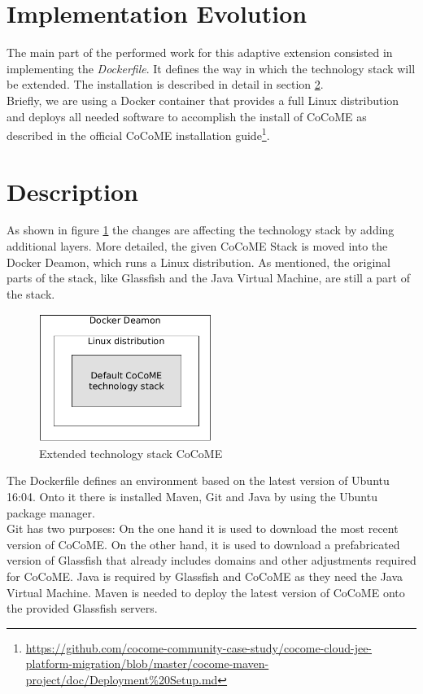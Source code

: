\documentclass[runningheads]{llncs}
\begin{document}
\section{Implementation Evolution}
	The main part of the performed work for this adaptive extension consisted in implementing the \textit{Dockerfile}. It defines the way in which the technology stack will be extended. The installation is described in detail in section \ref*{description}.\\ 
	Briefly, we are using a Docker container that provides a full Linux distribution and deploys all needed software to accomplish the install of CoCoME as described in the official  CoCoME installation guide\footnote{\url{https://github.com/cocome-community-case-study/cocome-cloud-jee-platform-migration/blob/master/cocome-maven-project/doc/Deployment\%20Setup.md}}.


\section{Description}\label{description}
	As shown in figure \ref*{techStack} the changes are affecting the technology stack by adding additional layers. More detailed, the given CoCoME Stack is moved into the Docker Deamon, which runs a Linux distribution. As mentioned, the original parts of the stack, like Glassfish and the Java Virtual Machine, are still a part of the stack.\\
\begin{figure}[H]
	\centering
	\includegraphics[width = 0.5\textwidth]{img/tech_stack_CoCoME.png}
	\caption{Extended technology stack CoCoME}
	\label{techStack}
\end{figure}
	
	The Dockerfile defines an environment based on the latest version of Ubuntu 16:04. Onto it there is installed Maven, Git and Java by using the Ubuntu package manager.\\
	Git has two purposes: On the one hand it is used to download the most recent version of CoCoME.	On the other hand, it is used to download a prefabricated version of Glassfish that already includes domains and other adjustments required for CoCoME. Java is required by Glassfish and CoCoME as they need the Java Virtual Machine. Maven is needed to deploy the latest version of CoCoME onto the provided Glassfish servers.
\end{document}
